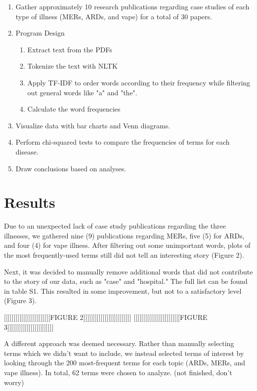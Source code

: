 \documentclass[article]{article}
\begin{document}
\begin{enumerate}
    \item Gather approximately 10 research publications regarding case studies of each type of illness (MERs, ARDs, and vape) for a total of 30 papers.
    \item Program Design
    \begin{enumerate}
        \item Extract text from the PDFs
        \item Tokenize the text with NLTK \cite{BirdKleinLoper09}
        \item Apply TF-IDF to order words according to their frequency while filtering out general words like "a" and "the".
        \item Calculate the word frequencies
    \end{enumerate}
    \item Visualize data with bar charts and Venn diagrams.
    \item Perform chi-squared tests to compare the frequencies of terms for each disease.
    \item Draw conclusions based on analyses.
\end{enumerate}

\section{Results}
Due to an unexpected lack of case study publications regarding the three illnesses, we gathered nine (9) publications regarding MERs, five (5) for ARDs, and four (4) for vape illness. After filtering out some unimportant words, plots of the most frequently-used terms still did not tell an interesting story (Figure 2). 

Next, it was decided to manually remove additional words that did not contribute to the story of our data, such as "case" and "hospital." The full list can be found in table S1. This resulted in some improvement, but not to a satisfactory level (Figure 3).

\medskip

[[[[[[[[[[[[[[[[[[[[[[[[FIGURE 2]]]]]]]]]]]]]]]]]]]]]]]]] [[[[[[[[[[[[[[[[[[[[[[[[FIGURE 3]]]]]]]]]]]]]]]]]]]]]]]]

\medskip

\noindent
A different approach was deemed necessary. Rather than manually selecting terms which we didn't want to include, we instead selected terms of interest by looking through the 200 most-frequent terms for each topic (ARDs, MERs, and vape illness). In total, 62 terms were chosen to analyze.
\medskip
(not finished, don't worry)

\clearpage

\printbibliography
\end{document}
